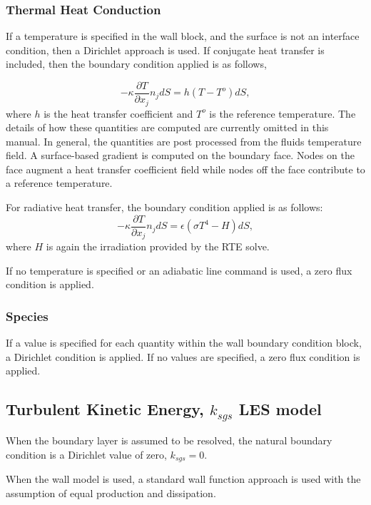 \subsubsection{Thermal Heat Conduction}
If a temperature is specified in the wall block, and the surface is not an interface condition, then a Dirichlet
approach is used. If conjugate heat transfer is included, then
the boundary condition applied is as follows,

\begin{equation}
     -\kappa \frac{\partial T} {\partial x_j} n_j dS = h(T-T^o)dS,
\end{equation}
where $h$ is the heat transfer coefficient and $T^o$ is the reference
temperature. The details of how these quantities are computed are currently omitted
in this manual. In general, the quantities are post processed from the fluids temperature field. A surface-based
gradient is computed on the boundary face. Nodes on the face augment a heat transfer coefficient field while
nodes off the face contribute to a reference temperature. 

For radiative heat transfer, the boundary condition 
applied is as follows:
\begin{equation}
     -\kappa \frac{\partial T} {\partial x_j} n_j dS = \epsilon (\sigma T^4 - H) dS,
\end{equation}
where $H$ is again the irradiation provided by the RTE solve.

If no temperature is specified or an adiabatic line command is used, a zero flux condition is applied.

\subsubsection{Species}
If a value is specified for each quantity within the wall boundary condition block, a Dirichlet condition
is applied. If no values are specified, a zero flux condition is applied.

\subsection{Turbulent Kinetic Energy, $k_{sgs}$ LES model}
When the boundary layer is assumed to be resolved, the natural boundary condition is a Dirichlet value of zero, 
$k_{sgs} = 0$. 

When the wall model is used, a standard wall function approach is used with the assumption of equal production and
dissipation.

